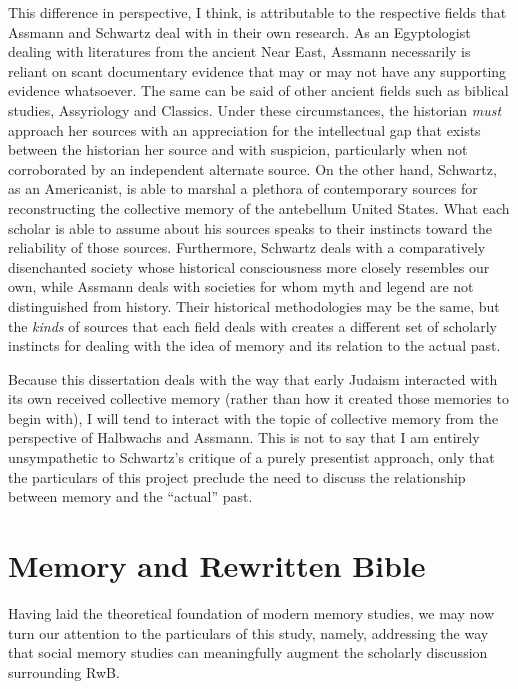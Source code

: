 This difference in perspective, I think, is attributable to the
respective fields that Assmann and Schwartz deal with in their own
research. As an Egyptologist dealing with literatures from the ancient
Near East, Assmann necessarily is reliant on scant documentary evidence
that may or may not have any supporting evidence whatsoever. The same
can be said of other ancient fields such as biblical studies,
Assyriology and Classics. Under these circumstances, the historian
\emph{must} approach her sources with an appreciation for the
intellectual gap that exists between the historian her source and with
suspicion, particularly when not corroborated by an independent
alternate source. On the other hand, Schwartz, as an Americanist, is
able to marshal a plethora of contemporary sources for reconstructing
the collective memory of the antebellum United States. What each scholar
is able to assume about his sources speaks to their instincts toward the
reliability of those sources. Furthermore, Schwartz deals with a
comparatively disenchanted society whose historical consciousness more
closely resembles our own, while Assmann deals with societies for whom
myth and legend are not distinguished from history. Their historical
methodologies may be the same, but the \emph{kinds} of sources that each
field deals with creates a different set of scholarly instincts for
dealing with the idea of memory and its relation to the actual past.

Because this dissertation deals with the way that early Judaism
interacted with its own received collective memory (rather than how it
created those memories to begin with), I will tend to interact with the
topic of collective memory from the perspective of Halbwachs and
Assmann. This is not to say that I am entirely unsympathetic to
Schwartz's critique of a purely presentist approach, only that the
particulars of this project preclude the need to discuss the
relationship between memory and the ``actual'' past.

\hypertarget{memory-and-rwb}{%
\section{Memory and Rewritten Bible}\label{memory-and-rwb}}

Having laid the theoretical foundation of modern memory studies, we may
now turn our attention to the particulars of this study, namely,
addressing the way that social memory studies can meaningfully augment
the scholarly discussion surrounding RwB.\autocite[See
also][]{brooke_zsengeller2014}

